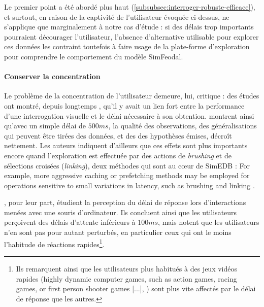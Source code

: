 Le premier point a été abordé plus haut (\cref{subsubsec:interroger-robuste-efficace}), et surtout, en raison de la \og captivité\fg{} de l'utilisateur évoquée ci-dessus, ne s'applique que marginalement à notre cas d'étude : si des délais trop importants pourraient décourager l'utilisateur, l'absence d'alternative utilisable pour explorer ces données les contraint toutefois à faire usage de la plate-forme d'exploration pour comprendre le comportement du modèle SimFeodal.

\paragraph*{Conserver la concentration}

Le problème de la concentration de l'utilisateur demeure, lui, critique : des études ont montré, depuis longtemps \autocite{mackenzie_lag_1993}, qu'il y avait un lien fort entre la performance d'une interrogation visuelle et le délai nécessaire à son obtention.
\cite[8]{liu_effects_2014} montrent ainsi qu'avec un simple délai de $500ms$, la qualité des observations, des généralisations qui peuvent être tirées des données, et des des hypothèses émises, décroît nettement. Les auteurs indiquent d'ailleurs que ces effets sont plus importants encore quand l'exploration est effectuée par des actions de \textit{brushing} et de sélections croisées (\textit{linking}), deux méthodes qui sont au cœur de SimEDB : \og For example, more aggressive caching or prefetching methods may be employed for operations sensitive to small variations in latency, such as brushing and linking \fg{}\autocite[9]{liu_effects_2014}.

\cite{forch_are_2017}, pour leur part, étudient la perception du délai de réponse lors d'interactions menées avec une souris d'ordinateur. Ils concluent ainsi que les utilisateurs perçoivent des délais d'attente inférieurs à $100ms$, mais notent que les utilisateurs n'en sont pas pour autant perturbés, en particulier ceux qui ont le moins l'habitude de réactions rapides\footnote{
Ils remarquent ainsi que les utilisateurs plus habitués à des jeux vidéos rapides (\og highly dynamic computer games, such as action games, racing games, or first person shooter games [...]\fg{}, \cite[51]{forch_are_2017}) sont plus vite affectés par le délai de réponse que les autres.
}.

